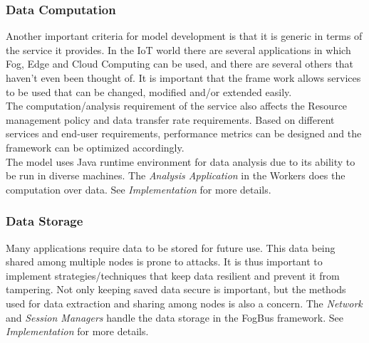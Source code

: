 \documentclass[10pt,journal,compsoc]{IEEEtran}
\begin{document}
\subsubsection{Data Computation}
Another important criteria for model development is that it is generic in terms of the service it provides. In the IoT world there are several applications in which Fog, Edge and Cloud Computing can be used, and there are several others that haven’t even been thought of. It is important that the frame work allows services to be used that can be changed, modified and/or extended easily. \\
The computation/analysis requirement of the service also affects the Resource management policy and data transfer rate requirements. Based on different services and end-user requirements, performance metrics can be designed and the framework can be optimized accordingly.\\
The model uses Java runtime environment for data analysis due to its ability to be run in diverse machines. The \textit{Analysis Application} in the Workers does the computation over data. See \textit{Implementation} for more details.

\subsubsection{Data Storage}
Many applications require data to be stored for future use. This data being shared among multiple nodes is prone to attacks. It is thus important to implement strategies/techniques that keep data resilient and prevent it from tampering. Not only keeping saved data secure is important, but the methods used for data extraction and sharing among nodes is also a concern. The \textit{Network} and \textit{Session Managers} handle the data storage in the FogBus framework. See \textit{Implementation} for more details.
\end{document}
